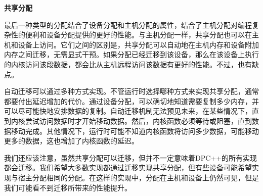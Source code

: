 \hspace*{\fill} \par %
\textbf{共享分配}

最后一种类型的分配结合了设备分配和主机分配的属性，结合了主机分配对编程复杂性的便利和设备分配提供的更好的性能。与主机分配一样，共享分配也可以在主机和设备上访问。它们之间的区别是，共享分配可以自动地在主机内存和设备附加内存之间迁移，无需显式干预。如果分配已经迁移到该设备，那么在该设备上执行的内核访问该段数据，都会比从主机远程访问该数据有更好的性能。不过，也有缺点。\par

自动迁移可以通过多种方式实现。不管运行时选择哪种方式来实现共享分配，通常都要付出延迟增加的代价。通过设备分配，可以确切地知道需要复制多少内存，并可以尽可能快地安排数据的复制。自动迁移机制无法预见未来，在某些情况下，直到内核尝试访问数据时才开始移动数据。然后，内核函数必须等待或阻塞，直到数据移动完成。其他情况下，运行时可能不知道内核函数将访问多少数据，可能移动更多的数据，这也增加了内核函数的延迟。\par

我们还应该注意，虽然共享分配可以迁移，但并不一定意味着DPC++的所有实现都会迁移。我们希望大多数实现都通过迁移实现共享分配，但有些设备可能希望实现与宿主分配相同的分配。在这样的实现中，分配在主机和设备上仍然可见，但是我们可能看不到迁移所带来的性能提升。\par






































